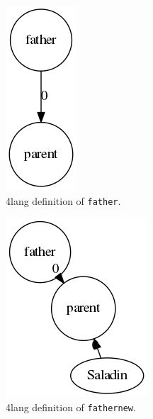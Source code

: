 \documentclass[10pt, a4paper]{article}
\begin{document}
\begin{figure}
\centering
    \includegraphics[scale=0.5]{father.png}
\caption{4lang definition of \texttt{father}.}
\label{fig:father}
\end{figure}

\begin{figure}
\centering
    \includegraphics[scale=0.5]{fathernew.png}
\caption{4lang definition of \texttt{fathernew}.}
\label{fig:fathernew}
\end{figure}
\end{document}
